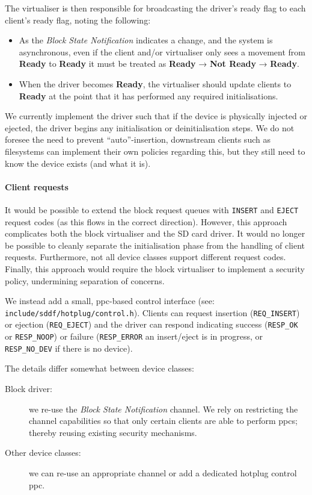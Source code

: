 \documentclass[a4paper,12pt]{report}
\begin{document}
The virtualiser is then responsible for broadcasting the driver's ready
flag to each client's ready flag, noting the following:

\begin{itemize}
\item As the \emph{Block State Notification} indicates a change, and the
  system is asynchronous, even if the client and/or virtualiser only
  sees a movement from \textbf{Ready} to \textbf{Ready} it must be
  treated as \textbf{Ready} → \textbf{Not Ready} → \textbf{Ready}.

\item When the driver becomes \textbf{Ready}, the virtualiser should
  update clients to \textbf{Ready} at the point that it has performed
  any required initialisations.
\end{itemize}


We currently implement the driver such that if the device is
physically injected or ejected, the driver begins any initialisation
or deinitialisation steps. We do not foresee the need to prevent
``auto''-insertion, downstream clients such as filesystems can
implement their own policies regarding this, but they still need to
know the device exists (and what it is).

\paragraph{Client requests}

It would be possible to extend the block request queues with
\texttt{INSERT} and \texttt{EJECT} request codes (as this flows in the
correct direction). However, this approach complicates both the
block virtualiser and the SD card driver. It would no longer be
possible to cleanly separate the initialisation phase from the
handling of client requests. Furthermore, not all device classes
support different request codes. Finally, this approach would require
the block virtualiser to implement a security policy, undermining
separation of concerns.

We instead add a small, \gls{ppc}-based control interface (see:
\texttt{include/sddf/hotplug/control.h}).  Clients can request
insertion (\texttt{REQ\_INSERT}) or ejection (\texttt{REQ\_EJECT}) and
the driver can respond indicating success (\texttt{RESP\_OK} or
\texttt{RESP\_NOOP}) or failure (\texttt{RESP\_ERROR} an insert/eject
is in progress, or \texttt{RESP\_NO\_DEV} if there is no device).

The details differ somewhat between device classes:
\begin{description}
\item[Block driver:] we re-use the \emph{Block State Notification}
  channel. We rely on restricting the channel capabilities so that
  only certain clients are able to perform \gls{ppc}s; thereby reusing
  existing security mechanisms.

\item[Other device classes:] we can re-use an appropriate channel or
  add a dedicated hotplug control \gls{ppc}.
\end{description}
\end{document}
